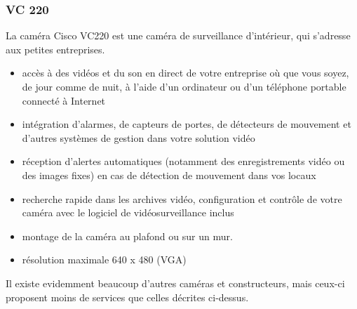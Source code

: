 \subsubsection{VC 220}
La caméra Cisco VC220 est une caméra de surveillance d'intérieur, qui s'adresse
aux petites entreprises.
\begin{itemize}
  \item accès à des vidéos et du son en direct de votre entreprise où que vous
  soyez, de jour comme de nuit, à l'aide d'un ordinateur ou d'un téléphone
  portable connecté à Internet
  \item intégration d'alarmes, de capteurs de portes, de détecteurs de mouvement
  et d'autres systèmes de gestion dans votre solution vidéo
  \item réception d'alertes automatiques (notamment des enregistrements vidéo ou
  des images fixes) en cas de détection de mouvement dans vos locaux
  \item recherche rapide dans les archives vidéo, configuration et contrôle de
  votre caméra avec le logiciel de vidéosurveillance inclus
  \item montage de la caméra au plafond ou sur un mur.
  \item résolution maximale 640 x 480 (VGA)
\end{itemize}
Il existe evidemment beaucoup d'autres caméras et constructeurs, mais ceux-ci
proposent moins de services que celles décrites ci-dessus.






